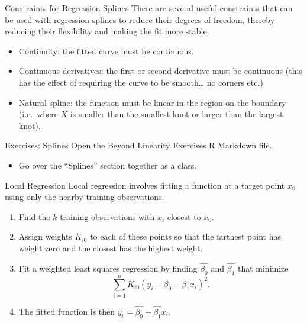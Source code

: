 \documentclass[
  ignorenonframetext,
  aspectratio=169,
]{beamer}
\providecommand{\tightlist}{%
  \setlength{\itemsep}{0pt}\setlength{\parskip}{0pt}}\usepackage{longtable,booktabs,array}
\begin{document}
\begin{frame}{Constraints for Regression Splines}
\protect\hypertarget{constraints-for-regression-splines}{}
There are several useful constraints that can be used with regression
splines to reduce their degrees of freedom, thereby reducing their
flexibility and making the fit more stable.

\begin{itemize}
\item
  \alert{Continuity}: the fitted curve must be continuous.
\item
  \alert{Continuous derivatives}: the first or second derivative must be
  continuous (this has the effect of requiring the curve to be
  smooth\ldots{} no corners etc.)
\item
  \alert{Natural spline}: the function must be linear in the region on
  the boundary (i.e.~where \(X\) is smaller than the smallest knot or
  larger than the largest knot).
\end{itemize}
\end{frame}

\begin{frame}{Exercises: Splines}
\protect\hypertarget{exercises-splines}{}
Open the Beyond Linearity Exercises R Markdown file.

\begin{itemize}
\tightlist
\item
  Go over the ``Splines'' section together as a class.
\end{itemize}
\end{frame}

\begin{frame}{Local Regression}
\protect\hypertarget{local-regression}{}
Local regression involves fitting a function at a target point \(x_0\)
using only the nearby training observations.

\begin{enumerate}
\item
  Find the \(k\) training observations with \(x_i\) closest to \(x_0\).
\item
  Assign weights \(K_{i0}\) to each of these points so that the farthest
  point has weight zero and the closest has the highest weight.
\item
  Fit a weighted least squares regression by finding \(\hat{\beta_0}\)
  and \(\hat{\beta_1}\) that minimize
  \[\sum_{i=1}^{n} K_{i 0}\left(y_{i}-\beta_{0}-\beta_{1} x_{i}\right)^{2}.\]
\item
  The fitted function is then
  \(y_i = \hat{\beta_0} + \hat{\beta_1} x_i\).
\end{enumerate}
\end{frame}
\end{document}

